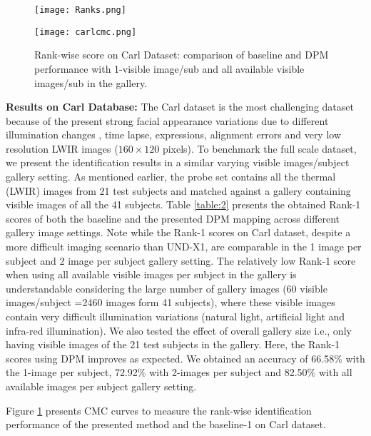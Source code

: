 \documentclass[smallextended,natbib]{svjour3}       \usepackage{graphicx}
\begin{document}
\begin{figure}
  \begin{minipage}[t]{0.48\textwidth}  
    \texttt{[image: Ranks.png]}
	\caption{Rank-wise score on UND X1: comparison of baseline and DPM performance with 1-visible image/sub and all available visible images/sub in the gallery.}
    \label{fig:3}
  \end{minipage}
  \hfill
  \begin{minipage}[t]{0.48\textwidth}
    \texttt{[image: carlcmc.png]}
\caption{Rank-wise score on Carl Dataset: comparison of baseline and DPM performance with 1-visible image/sub and all available visible images/sub in the gallery.}    
\label{fig:4}
  \end{minipage}
\end{figure}    
\noindent\textbf{Results on Carl Database:} The Carl dataset is the most challenging dataset because of the present strong facial appearance variations due to different illumination changes , time lapse, expressions, alignment errors and very low resolution LWIR images ($160 \times 120$ pixels). To benchmark the full scale dataset, we present the identification results in a similar varying visible images/subject gallery setting. As mentioned earlier, the probe set contains all the thermal (LWIR) images from 21  test subjects and matched against a gallery containing visible images of all the 41 subjects. Table \ref{table:2} presents the obtained Rank-1 scores of both the baseline and the presented DPM mapping across different gallery image settings. Note while the Rank-1 scores on Carl dataset, despite a more difficult imaging scenario than UND-X1, are comparable in the 1 image per subject and 2 image per subject gallery setting. The relatively low Rank-1 score when using all available visible images per subject in the gallery is understandable considering the large number of gallery images (60 visible images/subject =2460 images form 41 subjects), where these visible images contain very difficult illumination variations (natural light, artificial light and infra-red illumination). We also tested the effect of overall gallery size i.e., only having visible images of the 21 test subjects in the gallery. Here, the Rank-1 scores using DPM improves as expected. We obtained an accuracy of 66.58\% with the 1-image per subject, 72.92\% with 2-images per subject and 82.50\% with all available images per subject gallery setting.

Figure \ref{fig:4} presents CMC curves to measure the rank-wise identification performance of the presented method and the baseline-1 on Carl dataset.
   
\end{document}
